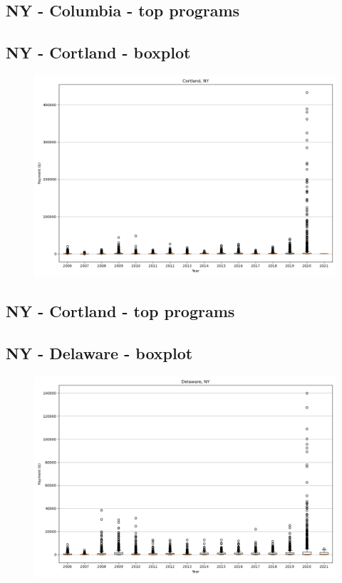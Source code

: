 \subsection*{NY - Columbia - top programs}

\newpage
\subsection*{NY - Cortland - boxplot}
\begin{figure}[h]
\centering
\includegraphics[width=7in]{../output/boxplots/counties/Cortland-NY_boxplot.png}
\end{figure}


\subsection*{NY - Cortland - top programs}

\newpage
\subsection*{NY - Delaware - boxplot}
\begin{figure}[h]
\centering
\includegraphics[width=7in]{../output/boxplots/counties/Delaware-NY_boxplot.png}
\end{figure}


